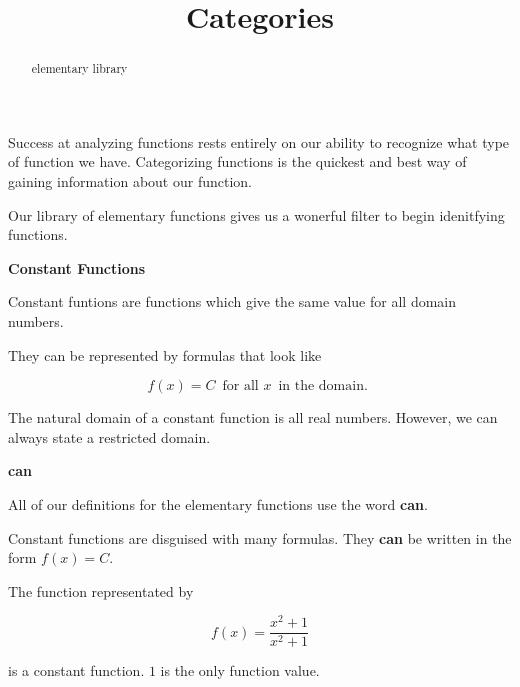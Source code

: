 \documentclass{ximera}
\title{Categories}
\begin{document}
\begin{abstract}
elementary library
\end{abstract}
\maketitle




Success at analyzing functions rests entirely on our ability to recognize what type of function we have.  Categorizing functions is the quickest and best way of gaining information about our function.

Our library of elementary functions gives us a wonerful filter to begin idenitfying functions.  



\begin{template}  \textbf{\textcolor{blue!55!black}{Constant Functions}} 



Constant funtions are functions which give the same value for all domain numbers. 


They can be represented by formulas that look like


\[ f(x) = C  \,  \text{ for all } x  \, \text{ in the domain. }   \]



\end{template}



The natural domain of a constant function is all real numbers.  However, we can always state a restricted domain.




\begin{warning}   \textbf{\textcolor{red!70!black}{can}}  

All of our definitions for the elementary functions use the word \textbf{\textcolor{red!80!black}{can}}.



Constant functions are disguised with many formulas.  They \textbf{\textcolor{red!80!black}{can}} be written in the form $f(x) = C$.



\end{warning}




\begin{example}

The function representated by 

\[ f(x) = \frac{x^2 + 1}{x^2 + 1}    \]

is a constant function.   $1$ is the only function value.


\end{example}
\end{document}
